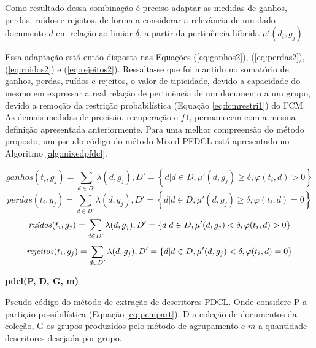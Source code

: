 Como resultado dessa combinação é preciso adaptar as medidas de ganhos, perdas, ruídos e rejeitos,
de forma a considerar a relevância de um dado documento $d$ em relação ao limiar $\delta$, a partir
da pertinência híbrida $\mu'(d_i,g_j)$. 

Essa adaptação está então disposta nas Equações (\ref{eq:ganhos2}), (\ref{eq:perdas2}),
(\ref{eq:ruidos2}) e (\ref{eq:rejeitos2}). Ressalta-se que foi mantido no somatório de ganhos,
perdas, ruídos e rejeitos, o valor de tipicidade, devido a capacidade do mesmo em expressar a real
relação de pertinência de um documento a um grupo, devido a remoção da restrição probabilística
(Equação \ref{eq:fcmrestri1}) do
FCM. As demais medidas de precisão, recuperação e $f1$, permanecem com a mesma
definição apresentada anteriormente. Para uma melhor compreensão do método proposto, um pseudo
código do método Mixed-PFDCL está apresentado no Algoritmo \ref{alg:mixedpfdcl}.

\begin{equation}
  ganhos(t_i,g_j) = 
  \sum_{
      d \in D' 
  } \lambda(d,g_j), D' = \left\{d | d \in D, \mu'(d,g_j) \geq \delta, \varphi(t_i,d) > 0
  \right\}
  \label{eq:ganhos2}
\end{equation}
\begin{equation}
  perdas(t_i,g_j) = 
  \sum_{
      d \in D' 
  } \lambda(d,g_j), D' = \left\{d | d \in D, \mu'(d,g_j) \geq \delta, \varphi(t_i,d) = 0
  \right\}
  \label{eq:perdas2}
\end{equation}
\begin{equation}
  \text{\it ruídos\/}(t_i,g_j) = 
  \sum_{
      d \in D' 
  } \lambda(d,g_j), D' = \left\{d | d \in D, \mu'(d,g_j) < \delta, \varphi(t_i,d) > 0 \right\}
  \label{eq:ruidos2}
\end{equation}
\begin{equation}
  \text{\it rejeitos\/}(t_i,g_j) = 
  \sum_{
      d \in D' 
  } \lambda(d,g_j), D' = \left\{d | d \in D, \mu'(d,g_j) < \delta, \varphi(t_i,d) = 0 \right\}
  \label{eq:rejeitos2}
\end{equation}

\begin{algorithm}[!htp] 
  \SetAlgoLined 
  \textbf{{\color{blue}pdcl}(P, D, G, m)}\\
  \caption{Pseudo código do método de extração de descritores PDCL. Onde
    considere P a partição
  possibilística (Equação \ref{eq:pcmpart}), D a coleção de documentos da coleção, G os grupos
produzidos pelo método de agrupamento e $m$ a quantidade descritores desejada por grupo.}
\label{alg:pdcl} 
\end{algorithm}

